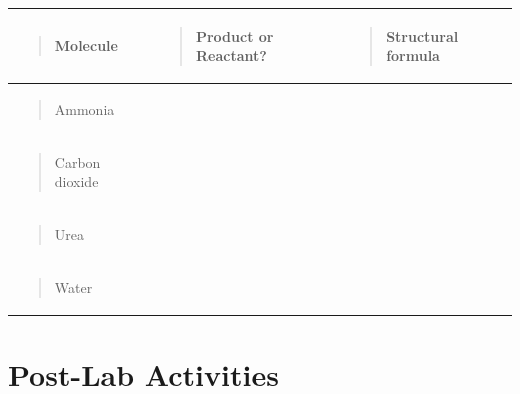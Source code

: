 \documentclass[
  letterpaper,
  DIV=11,
  numbers=noendperiod]{scrreprt}
\newcounter{none} %
\begin{document}
{\def\LTcaptype{none} %
\begin{longtable}[]{@{}
  >{\raggedright\arraybackslash}p{}
  >{\raggedright\arraybackslash}p{}
  >{\raggedright\arraybackslash}p{}@{}}
\toprule\noalign{}
\begin{minipage}[b]{\linewidth}\raggedright
\begin{quote}
\textbf{Molecule}
\end{quote}
\end{minipage} & \begin{minipage}[b]{\linewidth}\raggedright
\begin{quote}
\textbf{Product or Reactant?}
\end{quote}
\end{minipage} & \begin{minipage}[b]{\linewidth}\raggedright
\begin{quote}
\textbf{Structural formula}
\end{quote}
\end{minipage} \\
\midrule\noalign{}
\endhead
\bottomrule\noalign{}
\endlastfoot
\begin{minipage}[t]{\linewidth}\raggedright
\begin{quote}
Ammonia
\end{quote}
\end{minipage} & & \\
\begin{minipage}[t]{\linewidth}\raggedright
\begin{quote}
Carbon dioxide
\end{quote}
\end{minipage} & & \\
\begin{minipage}[t]{\linewidth}\raggedright
\begin{quote}
Urea
\end{quote}
\end{minipage} & & \\
\begin{minipage}[t]{\linewidth}\raggedright
\begin{quote}
Water
\end{quote}
\end{minipage} & & \\
\end{longtable}
}

\section{\texorpdfstring{\textbf{Post-Lab
Activities}}{Post-Lab Activities}}\label{post-lab-activities}
\end{document}
